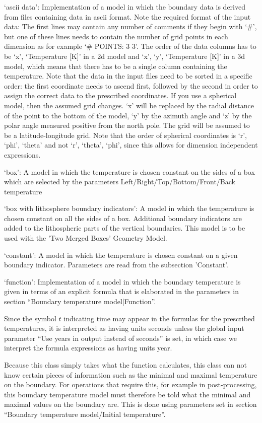 \begin{itemize}
`ascii data': Implementation of a model in which the boundary data is derived from files containing data in ascii format. Note the required format of the input data: The first lines may contain any number of comments if they begin with `#', but one of these lines needs to contain the number of grid points in each dimension as for example `# POINTS: 3 3'. The order of the data columns has to be `x', `Temperature [K]' in a 2d model and  `x', `y', `Temperature [K]' in a 3d model, which means that there has to be a single column containing the temperature. Note that the data in the input files need to be sorted in a specific order: the first coordinate needs to ascend first, followed by the second in order to assign the correct data to the prescribed coordinates. If you use a spherical model, then the assumed grid changes. `x' will be replaced by the radial distance of the point to the bottom of the model, `y' by the azimuth angle and `z' by the polar angle measured positive from the north pole. The grid will be assumed to be a latitude-longitude grid. Note that the order of spherical coordinates is `r', `phi', `theta' and not `r', `theta', `phi', since this allows for dimension independent expressions.

`box': A model in which the temperature is chosen constant on the sides of a box which are selected by the parameters Left/Right/Top/Bottom/Front/Back temperature

`box with lithosphere boundary indicators': A model in which the temperature is chosen constant on all the sides of a box. Additional boundary indicators are added to the lithospheric parts of the vertical boundaries. This model is to be used with the 'Two Merged Boxes' Geometry Model.

`constant': A model in which the temperature is chosen constant on a given boundary indicator.  Parameters are read from the subsection 'Constant'.

`function': Implementation of a model in which the boundary temperature is given in terms of an explicit formula that is elaborated in the parameters in section ``Boundary temperature model|Function''. 

Since the symbol $t$ indicating time may appear in the formulas for the prescribed temperatures, it is interpreted as having units seconds unless the global input parameter ``Use years in output instead of seconds'' is set, in which case we interpret the formula expressions as having units year.

Because this class simply takes what the function calculates, this class can not know certain pieces of information such as the minimal and maximal temperature on the boundary. For operations that require this, for example in post-processing, this boundary temperature model must therefore be told what the minimal and maximal values on the boundary are. This is done using parameters set in section ``Boundary temperature model/Initial temperature''.


\end{itemize}
